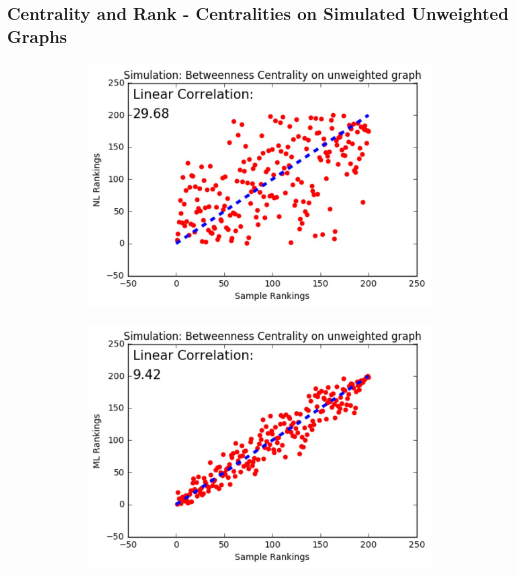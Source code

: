 \documentclass[9pt]{beamer}
\begin{document}
\begin{frame}
\frametitle{Centrality and Rank - Centralities on Simulated Unweighted Graphs}
\vspace{0.15in}
\begin{figure}[H]
\centering
\begin{subfigure}{.32\textwidth}
  \centering
  \includegraphics[width=0.95\linewidth]{BCU_NL.jpeg}
\end{subfigure}
\begin{subfigure}{.32\textwidth}
	\centering
    \includegraphics[width=0.95\linewidth]{BCU_ML.jpeg}
\end{subfigure}
\begin{subfigure}{.32\textwidth}

\end{subfigure}
\end{figure}
\end{frame}
\end{document}
